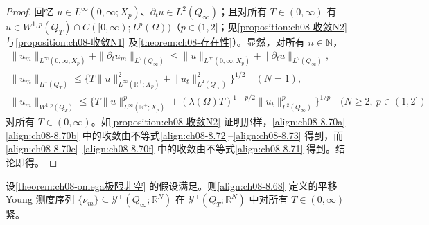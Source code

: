 \documentclass[../../main.tex]{subfiles}%
\begin{document}
\begin{proof}
回忆 $u\in L^\infty(0,\infty;X_p)$、$\partial_t u\in L^2(Q_\infty)$；且对所有 $T\in(0,\infty)$ 有 $u\in W^{1,p}(Q_T)\cap C([0,\infty);L^p(\Omega))$（$p\in(1,2]$；见\cref{proposition:ch08-收敛N2} 与\cref{proposition:ch08-收敛N1} 及\cref{theorem:ch08-存在性}）。显然，对所有 $n\in\mathbb{N}$，
\begin{align}
\|u_m\|_{L^\infty(0,\infty;X_p)}+\|\partial_t u_m\|_{L^2(Q_\infty)}
\leqslant\|u\|_{L^\infty(0,\infty;X_p)}+\|\partial_t u\|_{L^2(Q_\infty)}, \label{align:ch08-8.71}\\
\|u_m\|_{H^1(Q_T)}\leqslant\{T\|u\|^2_{L^\infty(\mathbb{R}^+;X_p)}+\|u_t\|^2_{L^2(Q_\infty)}\}^{1/2}\quad(N=1), \label{align:ch08-8.72}\\
\|u_m\|_{W^{1,p}(Q_T)}\leqslant\{T\|u\|^p_{L^\infty(\mathbb{R}^+;X_p)}+(\lambda(\Omega)T)^{1-p/2}\|u_t\|^p_{L^2(Q_\infty)}\}^{1/p}\quad(N\geqslant2,\ p\in(1,2]) \label{align:ch08-8.73}
\end{align}
对所有 $T\in(0,\infty)$。如\cref{proposition:ch08-收敛N2} 证明那样，\eqref{align:ch08-8.70a}--\eqref{align:ch08-8.70b} 中的收敛由不等式\eqref{align:ch08-8.72}--\eqref{align:ch08-8.73} 得到，而\eqref{align:ch08-8.70c}--\eqref{align:ch08-8.70f} 中的收敛由不等式\eqref{align:ch08-8.71} 得到。结论即得。
\end{proof}

\begin{lemma}\label{lemma:ch08-紧性}
设\cref{theorem:ch08-omega极限非空} 的假设满足。则\eqref{align:ch08-8.68} 定义的平移 Young 测度序列 $\{\nu_m\}\subseteq\mathcal{Y}^+(Q_\infty;\mathbb{R}^N)$ 在 $\mathcal{Y}^+(Q_T;\mathbb{R}^N)$ 中对所有 $T\in(0,\infty)$ 紧。
\end{lemma}
\end{document}
